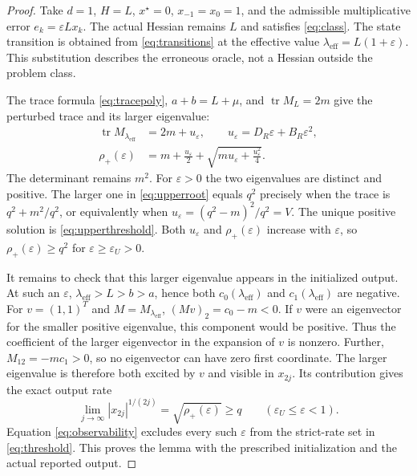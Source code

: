 \documentclass[pdflatex,sn-mathphys-num]{sn-jnl}
\theoremstyle{thmstyleone}
\theoremstyle{thmstyletwo}
\newcommand{\tr}{\operatorname{tr}}
\begin{document}
\begin{proof}
Take $d=1$, $H=L$, $x^\star=0$, $x_{-1}=x_0=1$,
and the admissible multiplicative error $e_k=\varepsilon Lx_k$.
The actual Hessian remains $L$ and satisfies \eqref{eq:class}.
The state transition is obtained from \eqref{eq:transitions}
at the effective value $\lambda_{\mathrm{eff}}=L(1+\varepsilon)$.
This substitution describes the erroneous oracle, not a Hessian
outside the problem class.

The trace formula \eqref{eq:tracepoly}, $a+b=L+\mu$, and
$\tr M_L=2m$ give the perturbed trace and its larger eigenvalue:
\begin{equation}\label{eq:upperroot}
\begin{split}
 \tr M_{\lambda_{\mathrm{eff}}}&=2m+u_\varepsilon,\qquad
 u_\varepsilon=D_R\varepsilon+B_R\varepsilon^2,\\
 \rho_+(\varepsilon)&=
       m+\frac{u_\varepsilon}{2}
        +\sqrt{mu_\varepsilon+\frac{u_\varepsilon^2}{4}} .
\end{split}
\end{equation}
The determinant remains $m^2$. For $\varepsilon>0$ the two
eigenvalues are distinct and positive. The larger one in
\eqref{eq:upperroot} equals $q^2$ precisely when the trace is
$q^2+m^2/q^2$, or equivalently when
$u_\varepsilon=(q^2-m)^2/q^2=V$.
The unique positive solution is \eqref{eq:upperthreshold}.
Both $u_\varepsilon$ and $\rho_+(\varepsilon)$ increase with
$\varepsilon$, so $\rho_+(\varepsilon)\geq q^2$ for
$\varepsilon\geq\varepsilon_U>0$.

It remains to check that this larger eigenvalue appears in the
initialized output. At such an $\varepsilon$,
$\lambda_{\mathrm{eff}}>L>b>a$, hence both
$c_0(\lambda_{\mathrm{eff}})$ and
$c_1(\lambda_{\mathrm{eff}})$ are negative.
For $v=(1,1)^T$ and $M=M_{\lambda_{\mathrm{eff}}}$,
$(Mv)_2=c_0-m<0$. If $v$ were an eigenvector for the smaller
positive eigenvalue, this component would be positive.
Thus the coefficient of the larger eigenvector in the expansion
of $v$ is nonzero. Further, $M_{12}=-mc_1>0$, so no eigenvector
can have zero first coordinate. The larger eigenvalue is therefore
both excited by $v$ and visible in $x_{2j}$. Its contribution gives
the exact output rate
\begin{equation}\label{eq:observability}
 \lim_{j\to\infty}|x_{2j}|^{1/(2j)}
     =\sqrt{\rho_+(\varepsilon)}\geq q
 \qquad(\varepsilon_U\leq\varepsilon<1).
\end{equation}
Equation \eqref{eq:observability} excludes every such
$\varepsilon$ from the strict-rate set in \eqref{eq:threshold}.
This proves the lemma with the prescribed initialization and
the actual reported output.
\end{proof}
\end{document}
